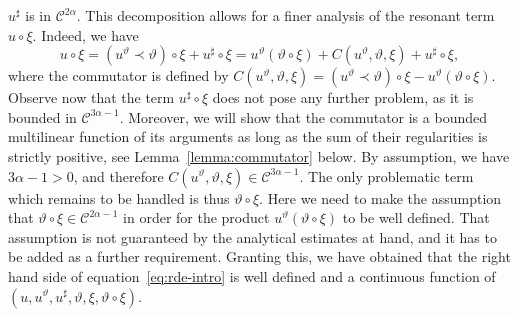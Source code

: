 \documentclass[11pt,a4paper]{article}
\theoremstyle{remark}
\newcommand{\CC}{\ensuremath{\mathscr{C}}}
\begin{document}
$u^{\sharp}$ is in $\CC^{2 \alpha}$. This decomposition allows for a finer analysis
of the resonant term $u \circ \xi$. Indeed, we have
\begin{equation}\label{eq:rde expand resonant term}
   u \circ   \xi = ( u^{\vartheta} \prec \vartheta ) \circ   \xi +u^{\sharp} \circ   \xi =u^{\vartheta} ( \vartheta \circ \xi ) +C ( u^{\vartheta} , \vartheta , \xi ) +u^{\sharp} \circ   \xi ,
\end{equation}
where the commutator is defined by $C ( u^{\vartheta} ,\vartheta , \xi ) = ( u^{\vartheta} \prec \vartheta ) \circ \xi -u^{\vartheta}( \vartheta \circ \xi )$. %
Observe now that the term $u^{\sharp} \circ   \xi$
does not pose any further problem, as it is bounded in $\CC^{3 \alpha -1}$.
Moreover, we will show that the commutator is a bounded multilinear function of its arguments as
long as the sum of their regularities is strictly positive, see
Lemma~\ref{lemma:commutator} below. By assumption, we have $3 \alpha -1>0$,
and therefore $C ( u^{\vartheta} , \vartheta , \xi ) \in \CC^{3 \alpha -1}$.
The only problematic term which remains to be handled is thus $\vartheta \circ   \xi$. Here we need to make the assumption that $\vartheta \circ \xi \in \CC^{2 \alpha -1}$ in order for the product $u^{\vartheta} (\vartheta \circ   \xi )$ to be well defined. That assumption is not guaranteed
by the analytical estimates at hand, and it has to be added as a
further requirement. Granting this, we have obtained that the right hand side
of equation~{\eqref{eq:rde-intro}} is well defined and a continuous function of $(u,u^{\vartheta} ,u^{\sharp} , \vartheta , \xi , \vartheta \circ \xi )$.
\end{document}
